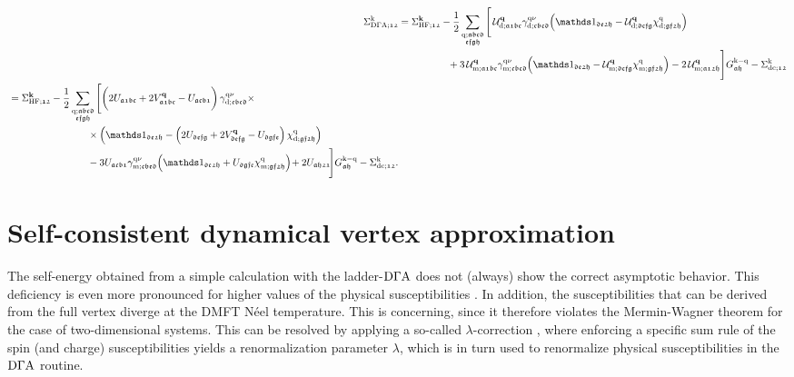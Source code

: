 \documentclass[../../main.tex]{subfiles}
\begin{document}
\begin{align}\label{eq:sde_vrg_ladder_full}
	\Sigma^{\k}_{\dga;\mathfrak{12}}&=\Sigma_{\text{HF};\mathfrak{12}}^{\vv{k}}-\frac12\sum_{\substack{\q;\mathfrak{abcd}\\\mathfrak{efgh}}}\Bigg [\,\mathcal{U}^{\vv{q}}_{\dens;\mathfrak{a1bc}}\gamma_{\dens;\mathfrak{cbed}}^{\q\nu}\!\left (\unity_{\mathfrak{de2h}}-\mathcal{U}^{\vv{q}}_{\dens;\mathfrak{defg}}\chi^{\q}_{\dens;\mathfrak{gf2h}}\right )\nonumber\\
	&\qquad\qquad\quad+3\, \mathcal{U}^{\vv{q}}_{\magn;\mathfrak{a1bc}}\gamma_{\magn;\mathfrak{cbed}}^{\q\nu}\!\left (\unity_{\mathfrak{de2h}}-\mathcal{U}^{\vv{q}}_{\magn;\mathfrak{defg}}\chi^{\q}_{\magn;\mathfrak{gf2h}}\right )-2\,\mathcal{U}^{\vv{q}}_{\magn;\mathfrak{a12h}}\Bigg]G_{\mathfrak{ah}}^{\k-\q} - \Sigma^{\k}_{\text{dc};\mathfrak{12}}\nonumber\\
\begin{split}
	&=\Sigma_{\text{HF};\mathfrak{12}}^{\vv{k}}-\frac12\sum_{\substack{\q;\mathfrak{abcd}\\\mathfrak{efgh}}}\Bigg [\bigg (2U_{\mathfrak{a1bc}} + 2V^{\vv{q}}_{\mathfrak{a1bc}} - U_{\mathfrak{acb1}} \bigg )\,\gamma_{\dens;\mathfrak{cbed}}^{\q\nu}\times\\
	&\qquad\qquad\qquad\qquad\times\Big (\unity_{\mathfrak{de2h}}-\left (2U_{\mathfrak{defg}}+2V^{\vv{q}}_{\mathfrak{defg}}-U_{\mathfrak{dgfe}}\right )\chi^{\q}_{\dens;\mathfrak{gf2h}}\Big )\\
	&\qquad\qquad\qquad\qquad-3 U_{\mathfrak{acb1}}\gamma_{\magn;\mathfrak{cbed}}^{\q\nu}\!\left (\unity_{\mathfrak{de2h}}+U_{\mathfrak{dgfe}}\chi^{\q}_{\magn;\mathfrak{gf2h}}\right )\!+2U_{\mathfrak{ah21}}\!\Bigg]G_{\mathfrak{ah}}^{\k-\q} - \Sigma^{\k}_{\text{dc};\mathfrak{12}}.
\end{split}
\end{align}

\section{Self-consistent dynamical vertex approximation}

The self-energy obtained from a simple  calculation with the ladder-$\text{D}\Gamma\text{A}$ does not (always) show the correct asymptotic behavior. This deficiency is even more pronounced for higher values of the physical susceptibilities \cite{Kaufmann2021}. In addition, the susceptibilities that can be derived from the full vertex diverge at the DMFT N\'eel temperature. This is concerning, since it therefore violates the Mermin-Wagner theorem \cite{Mermin1966} for the case of two-dimensional systems. This can be resolved by applying a so-called $\lambda$-correction \cite{Moriya1985}, where enforcing a specific sum rule of the spin (and charge) susceptibilities yields a renormalization parameter $\lambda$, which is in turn used to renormalize physical susceptibilities in the $\text{D}\Gamma\text{A}$ routine.
\end{document}
